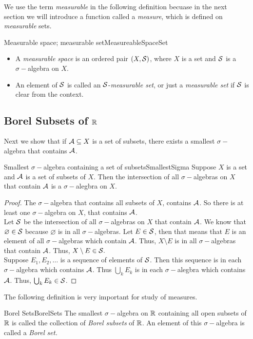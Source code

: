 \documentclass[twoside, openright, fontsize=10pt, headings=big]{scrbook}
\newcommand{\addunumberedsubsec}[1]{%
    \subsection*{#1}%
    \addcontentsline{toc}{subsection}{#1}%
}
\begin{document}
We use the term \textit{measurable} in the following definition becuase in the next section we will introduce a function called a \textit{measure}, which is defined on \textit{measurable} sets.
\begin{definition}{Measurable space; measurable set}{MeasureableSpaceSet}
    \begin{itemize}
        \item A \textit{measurable space} is an ordered pair $(X,\mathcal{S})$, where $X$ is a set and $\mathcal{S}$ is a $\sigma-$algebra on $X$.
        \item An element of $\mathcal{S}$ is called an $\mathcal{S}$-\textit{measurable set}, or just a \textit{measurable set} if $\mathcal{S}$ is clear from the context.
    \end{itemize}
\end{definition}
\addunumberedsubsec{Borel Subsets of $\mathbb{R}$}
Next we show that if $\mathcal{A}\subseteq X$ is a set of subsets, there exists a smallest $\sigma-$algebra that contains $\mathcal{A}$.
\begin{theorem}{Smallest $\sigma-$algebra containing a set of subsets}{SmallestSigma}
    Suppose $X$ is a set and $\mathcal{A}$ is a set of subsets of $X$. Then the intersection of all $\sigma-$algebras on $X$ that contain $\mathcal{A}$ is a $\sigma-$alegbra on $X$.
\end{theorem}
\begin{proof}
    The $\sigma-$algebra that contains all subsets of $X$, contains $\mathcal{A}$. So there is at least one $\sigma-$algebra on $X$, that contains $\mathcal{A}$.\\
    Let $\mathcal{S}$ be the intersection of all $\sigma-$algebras on $X$ that contain $\mathcal{A}$. We know that $\varnothing\in\mathcal{S}$ because $\varnothing$ is in all $\sigma-$algebras. Let $E\in\mathcal{S}$, then that means that $E$ is an element of all $\sigma-$algebras which contain $\mathcal{A}$. Thus, $X\setminus E$ is in all $\sigma-$algebras that contain $\mathcal{A}$. Thus, $X\setminus E\in\mathcal{S}.$\\
    Suppose $E_1,E_2,\dots$ is a sequence of elements of $\mathcal{S}$. Then this sequence is in each $\sigma-$algebra which contains $\mathcal{A}$. Thus $\bigcup_{k}E_k$ is in each $\sigma-$alegbra which contains $\mathcal{A}$. Thus, $\bigcup_{k}E_k\in\mathcal{S}$.
\end{proof}
The following definition is very important for study of measures.
\begin{definition}{Borel Sets}{BorelSets}
    The smallest $\sigma-$algebra on $\mathbb{R}$ containing all open subsets of $\mathbb{R}$ is called the collection of \textit{Borel subsets} of $\mathbb{R}$. An element of this $\sigma-$algebra is called a \textit{Borel set.}
\end{definition}
\end{document}
